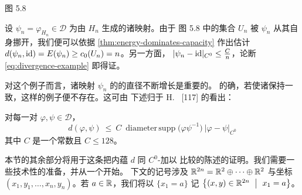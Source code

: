 \noindent\begin{minipage}{\linewidth}
\centering
{}

图 5.8
\end{minipage}

设 $\psi_{n}=\varphi_{H_{n}}\in\mathcal{D}$ 为由 $H_{n}$ 生成的诸映射。由于%
图 5.8 中的集合 $U_{n}$ 被 $\psi_{n}$ 从其自身挪开，我们便可以依据%
\cref{thm:energy-dominates-capacity}%
作出估计 $d(\psi_{n},\mathrm{id})=E(\psi_{n})\geq c_{0}(U_{n})=n$。另一方面，%
$\lvert\psi_{n}-\mathrm{id}\rvert_{C^{0}}\leq\frac{C}{n}$，论断%
\eqref{eq:divergence-example} 即得证。

对这个例子而言，诸映射 $\psi_{n}$ 的\trSupport{}的直径不断增长是重要的。%
的确，若使诸\trSupport{}保持一致\trBounded，这样的例子便不存在。这可由%
下述归于 H.~\trHofer{} [117] 的\trEstimate{}看出：

\begin{theorem}\label{thm:c0-comparison}
对每一对 $\varphi,\psi\in\mathcal{D}$，
\[
d(\varphi,\psi)\ \leq\ C\ \operatorname{diameter\,supp}\bigl(\varphi\psi^{-1}\bigr)%
\ \lvert\varphi-\psi\rvert_{C^{0}}
\]
其中 $C$ 是一个常数且 $C\leq128$。
\end{theorem}

本节的其余部分将用于这条把内蕴\trMetric{} $d$ 同 $C^{0}$-\trMetric{}加以%
比较的陈述的证明。我们需要一些技术性的准备，并从一个\trhDefinition{}开始。%
下文的记号涉及\trSymplecticSplitting{} $\mathbb{R}^{2n}=\mathbb{R}^{2}\oplus\dots\oplus\mathbb{R}^{2}$%
与坐标 $(x_{1},y_{1},\dots,x_{n},y_{n})$。若 $a\in\mathbb{R}$，我们将以%
$\{x_{1}=a\}$ 记\trHyperplane{}%
$\bigl\{(x,y)\in\R^{2n}\ \bigm|\ x_{1}=a\bigr\}$。

